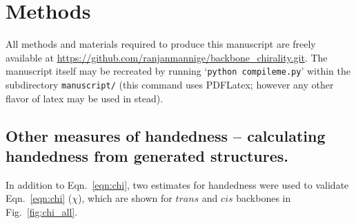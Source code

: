 \documentclass[fleqn,10pt]{wlpeerj} %
\newcommand{\Fig}[1]{Fig.~\ref{#1}}
\newcommand{\Eqn}[1]{Eqn.~\ref{#1}}
\begin{document}


\section*{Methods}
All methods and materials required to produce this manuscript are freely available at \url{https://github.com/ranjanmannige/backbone_chirality.git}.  The manuscript itself may be recreated by running `\texttt{python compileme.py}' within the subdirectory \texttt{manuscript/} (this command uses PDFLatex; however any other flavor of latex may be used in stead).

\subsection*{Other measures of handedness -- calculating handedness from generated structures.} 

In addition to \Eqn{eqn:chi}, two estimates for handedness were used to validate \Eqn{eqn:chi} ($\chi$), which are shown for $trans$ and $cis$ backbones in \Fig{fig:chi_all}. 
\end{document}

